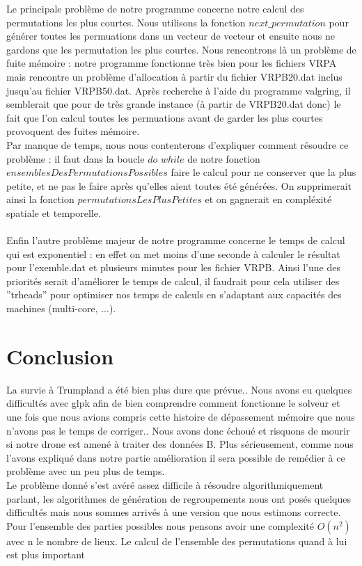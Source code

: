 \documentclass[a4paper,sffamily,12pt]{article}
\begin{document}
		\vspace{0.5cm}		

		Le principale problème de notre programme concerne notre calcul des permutations les plus courtes. Nous utilisons la fonction $next\_permutation$ pour générer toutes les permuations dans un vecteur de vecteur et ensuite nous ne gardons que les permutation les plus courtes. Nous rencontrons là un problème de fuite mémoire : notre programme fonctionne très bien pour les fichiers VRPA mais rencontre un problème d'allocation à partir du fichier VRPB20.dat inclus jusqu'au fichier VRPB50.dat. Après recherche à l'aide du programme valgring, il semblerait que pour de très grande instance (à partir de VRPB20.dat donc) le fait que l'on calcul toutes les permuations avant de garder les plus courtes provoquent des fuites mémoire. \\
		\indent Par manque de temps, nous nous contenterons d'expliquer comment résoudre ce problème : il faut dans la boucle $do$ $while$ de notre fonction $ensemblesDesPermutationsPossibles$ faire le calcul pour ne conserver que la plus petite, et ne pas le faire après qu'elles aient toutes été générées. On supprimerait ainsi la fonction $permutationsLesPlusPetites$ et on gagnerait en compléxité spatiale et temporelle. \\
		\\
		\indent Enfin l'autre problème majeur de notre programme concerne le temps de calcul qui est exponentiel : en effet on met moins d'une seconde à calculer le résultat pour l'exemble.dat et plusieurs minutes pour les fichier VRPB. Ainsi l'une des priorités serait d'améliorer le temps de calcul, il faudrait pour cela utiliser des ''trheads'' pour optimiser nos temps de calculs en s'adaptant aux capacités des machines (multi-core, ...). \\				
			
			

	
	\section{Conclusion}
	
		\vspace{0.5cm}

		La survie à Trumpland a été bien plus dure que prévue.. Nous avons eu quelques difficultés avec glpk afin de bien comprendre comment fonctionne le solveur et une fois que nous avions compris cette histoire de dépassement mémoire que nous n'avons pas le temps de corriger.. Nous avons donc échoué et risquons de mourir si notre drone est amené à traiter des données B. Plus sérieusement, comme nous l'avons expliqué dans notre partie amélioration il sera possible de remédier à ce problème avec un peu plus de temps.\\
		\indent Le problème donné s'est avéré assez difficile à résoudre algorithmiquement parlant, les algorithmes de génération de regroupements nous ont posés quelques difficultés mais nous sommes arrivés à une version que nous estimons correcte. Pour l'ensemble des parties possibles nous pensons avoir une complexité $O(n^{2})$ avec n le nombre de lieux. Le calcul de l'ensemble des permutations quand à lui est plus important %
										
\end{document}
